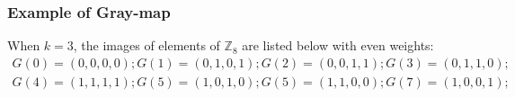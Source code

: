 \documentclass[
    aspectratio=169,                   %
]{beamer}
\renewcommand{\Bbb}{\mathbb}
\begin{document}
    \begin{frame}
        \frametitle{Example of Gray-map}
    
        \begin{example}
            When $ k=3 $, the images of elements of $ \Bbb Z_8 $ are listed below with even weights:
            \begin{align*}
                G(0)=(0,0,0,0);G(1)=(0,1,0,1);
                G(2)=(0,0,1,1);G(3)=(0,1,1,0);\\
                G(4)=(1,1,1,1);G(5)=(1,0,1,0);
                G(5)=(1,1,0,0);G(7)=(1,0,0,1);
            \end{align*}
        \end{example}
    
    \end{frame}
    
\end{document}
